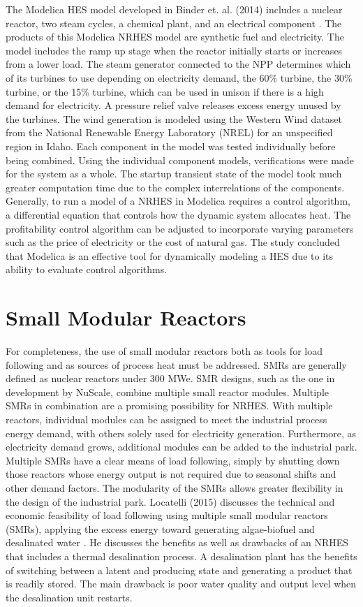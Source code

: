 \documentclass[12pt]{UIdahoMastersThesis}
\begin{document}
The Modelica HES model developed in Binder et. al. (2014) includes a nuclear reactor, two steam cycles, a chemical plant, and an electrical component \cite{Binder2014}. The products of this Modelica NRHES model are synthetic fuel and electricity. The model includes the ramp up stage when the reactor initially starts or increases from a lower load. The steam generator connected to the NPP determines which of its turbines to use depending on electricity demand, the 60\% turbine, the 30\% turbine, or the 15\% turbine, which can be used in unison if there is a high demand for electricity. A pressure relief valve releases excess energy unused by the turbines. The wind generation is modeled using the Western Wind dataset from the National Renewable Energy Laboratory (NREL) for an unspecified region in Idaho. Each component in the model was tested individually before being combined. Using the individual component models, verifications were made for the system as a whole. The startup transient state of the model took much greater computation time due to the complex interrelations of the components. Generally, to run a model of a NRHES in Modelica requires a control algorithm, a differential equation that controls how the dynamic system allocates heat. The profitability control algorithm can be adjusted to incorporate varying parameters such as the price of electricity or the cost of natural gas. The study concluded that Modelica is an effective tool for dynamically modeling a HES due to its ability to evaluate control algorithms.

\section{Small Modular Reactors}
For completeness, the use of small modular reactors both as tools for load following and as sources of process heat must be addressed. SMRs are generally defined as nuclear reactors under 300 MWe. SMR designs, such as the one in development by NuScale, combine multiple small reactor modules. Multiple SMRs in combination are a promising possibility for NRHES.  With multiple reactors, individual modules can be assigned to meet the industrial process energy demand, with others solely used for electricity generation. Furthermore, as electricity demand grows, additional modules can be added to the industrial park. Multiple SMRs have a clear means of load following, simply by shutting down those reactors whose energy output is not required due to seasonal shifts and other demand factors. The modularity of the SMRs allows greater flexibility in the design of the industrial park.  Locatelli (2015) discusses the technical and economic feasibility of load following using multiple small modular reactors (SMRs), applying the excess energy toward generating algae-biofuel and desalinated water \cite{Locatelli2015}. He discusses the benefits as well as drawbacks of an NRHES that includes a thermal desalination process. A desalination plant has the benefits of switching between a latent and producing state and generating a product that is readily stored. The main drawback is poor water quality and output level when the desalination unit restarts.
\end{document}
